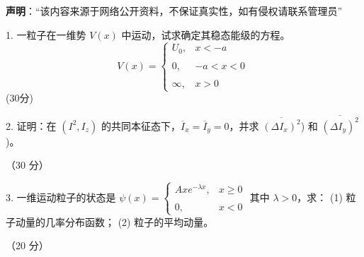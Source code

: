 
\textbf{声明}：“该内容来源于网络公开资料，不保证真实性，如有侵权请联系管理员”

1. 一粒子在一维势 \( V(x) \) 中运动，试求确定其稳态能级的方程。
$$V(x) = \begin{cases} U_0, & x < -a \\\\0, & -a < x < 0 \\\\\infty, & x > 0 \end{cases}~$$
(30分)

2. 证明：在 $\left( I^2, I_z \right)$ 的共同本征态下，$\overline{I}_x = \overline{I}_y = 0$，并求 $\overline{\left( \Delta I_x \right)^2}$) 和 $\overline{\left( \Delta I_y \right)^2}$)。

（30 分）

3. 一维运动粒子的状态是 $\psi(x) = \begin{cases} Axe^{-\lambda x}, & x \geq 0 \\\\0, & x < 0\end{cases}$
其中 $\lambda > 0$，求：
(1) 粒子动量的几率分布函数；
(2) 粒子的平均动量。

（20 分）